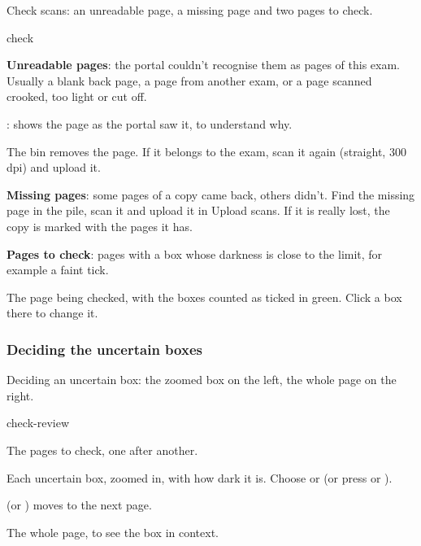 \documentclass[11pt]{article}
\begin{document}
\begin{keep}
\begin{guidefig}{Check scans: an unreadable page, a missing page and two pages to check.}
\begin{shot}{check}
\end{shot}
\end{guidefig}
\begin{callouts}
  \item \textbf{Unreadable pages}: the portal couldn't recognise them as pages of this exam. Usually a blank back page, a page from another exam, or a page scanned crooked, too light or cut off.
  \item {}: shows the page as the portal saw it, to understand why.
  \item The bin removes the page. If it belongs to the exam, scan it again (straight, 300\,dpi) and upload it.
  \item \textbf{Missing pages}: some pages of a copy came back, others didn't. Find the missing page in the pile, scan it and upload it in Upload scans. If it is really lost, the copy is marked with the pages it has.
  \item \textbf{Pages to check}: pages with a box whose darkness is close to the limit, for example a faint tick.
  \item The page being checked, with the boxes counted as ticked in green. Click a box there to change it.
\end{callouts}
\end{keep}

\subsubsection{Deciding the uncertain boxes}

\begin{keep}
\begin{guidefig}{Deciding an uncertain box: the zoomed box on the left, the whole page on the right.}
\begin{shot}{check-review}
\end{shot}
\end{guidefig}
\begin{callouts}
  \item The pages to check, one after another.
  \item Each uncertain box, zoomed in, with how dark it is. Choose  or  (or press  or ).
  \item {} (or ) moves to the next page.
  \item The whole page, to see the box in context.
\end{callouts}
\end{keep}
\end{document}
